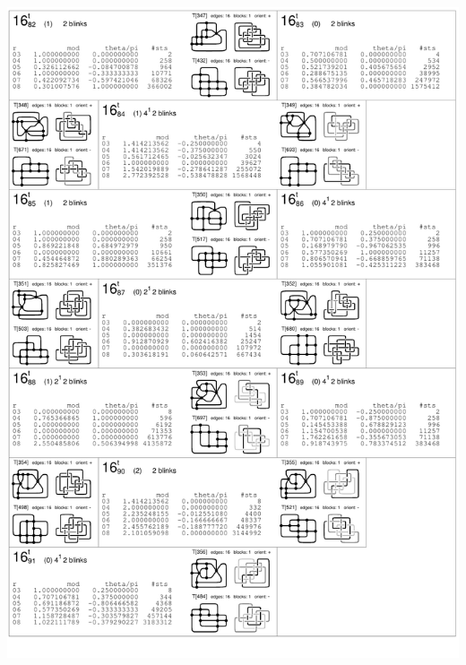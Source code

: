 \begin{center}
 \includegraphics[height=23.5cm]{E.figsbw2/con3catalog023_bw.pdf} \eject

\end{center}
